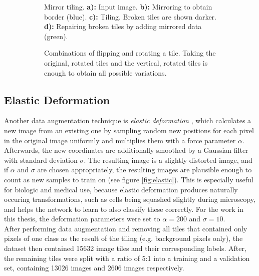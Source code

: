 \begin {figure}[!ht]
	\begin {subfigure}[{position=b}]{0.5\linewidth}
		\scalebox{0.5}{}

		\caption*{Mirror tiling. \textbf{a):} Input image. \textbf{b):} Mirroring to obtain border (blue). \textbf{c):} Tiling. Broken tiles are shown darker. \textbf{d):} Repairing broken tiles by adding mirrored data (green).}
	\end {subfigure}
	\hspace{1cm}
	\begin {subfigure}[{position=b}]{0.5\linewidth}
		\scalebox{0.5}{}

		\caption*{Combinations of flipping and rotating a tile. Taking the original, rotated tiles and the vertical, rotated tiles is enough to obtain all possible variations.}
	\end {subfigure}

		\caption[]{}
		\label{fig:tile_mirror_rotate}

\end {figure}


		\subsection{Elastic Deformation}
Another data augmentation technique is \textit{elastic deformation} \cite{elastic}, which calculates a new image from an existing one by sampling random new positions for each pixel in the original image uniformly and multiplies them with a force parameter $\alpha$. Afterwards, the new coordinates are additionally smoothed by a Gaussian filter with standard deviation $\sigma$. The resulting image is a slightly distorted image, and if $\alpha$ and $\sigma$ are chosen appropriately, the resulting images are plausible enough to count as new samples to train on (see figure \ref{fig:elastic}). This is especially useful for biologic and medical use, because elastic deformation produces naturally occuring transformations, such as cells being squashed slightly during microscopy, and helps the network to learn to also classify these correctly. For the work in this thesis, the deformation parameters were set to $\alpha = 200$ and $\sigma = 10$.\\

\noindent After performing data augmentation and removing all tiles that contained only pixels of one class as the result of the tiling (e.g. background pixels only), the dataset then contained 15632 image tiles and their corresponding labels. After, the remaining tiles were split with a ratio of 5:1 into a training and a validation set, containing 13026 images and 2606 images respectively.



